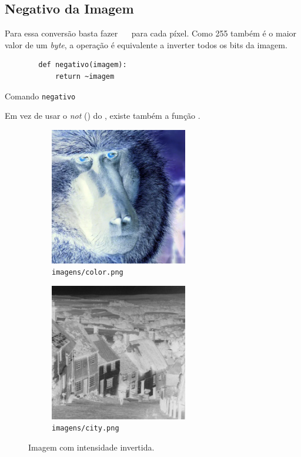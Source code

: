 \subsection{Negativo da Imagem}

Para essa conversão basta fazer ~~ para cada píxel. Como 255 também é o maior valor de um \textit{byte}, a operação é equivalente a inverter todos os bits da imagem.

\begin{listing}[H]
    \begin{verbatim}
        def negativo(imagem):
            return ~imagem
    \end{verbatim}

    \caption{Comando \texttt{negativo}}
\end{listing}

Em vez de usar o \textit{not} (\pyline{~}) do , existe também a função  \autocite{ref:bitwise_not}.

\begin{figure}[H]
    \centering
    \begin{subfigure}{0.45\textwidth}
        \centering
        \includegraphics[width=6cm]{resultados/colorneg.png}
        \caption{\texttt{imagens/color.png}}
    \end{subfigure}%
    \begin{subfigure}{0.45\textwidth}
        \centering
        \includegraphics[width=6cm]{resultados/cityneg.png}
        \caption{\texttt{imagens/city.png}}
    \end{subfigure}

    \caption{Imagem com intensidade invertida.}
\end{figure}
